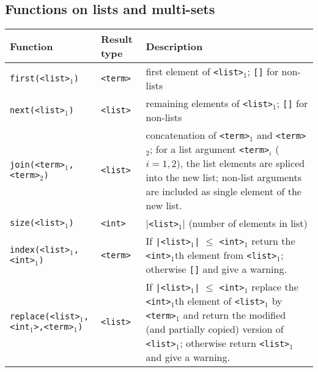 \documentclass[a4,twoside,noweb]{article} %
\begin{document}
\newpage

\subsection{Functions on lists and multi-sets}

\begin{tabular}{|l|l|p{8cm}|} \hline
 Function                       & Result type   & Description \\ \hline
 {\tt first(<list>$_1$)}                & {\tt  <term>}  & first element of {\tt <list>$_1$}; {\tt []} for non-lists\\
 {\tt next(<list>$_1$)}                 & {\tt  <list>}  & remaining elements of {\tt <list>$_1$}; {\tt []} for non-lists \\
 {\tt join(<term>$_1$,<term>$_2$)}      & {\tt  <list>}  & concatenation of {\tt <term>$_1$} and {\tt <term>$_2$};
                                                           for a list argument {\tt <term>$_i$} ($i=1,2$),
                                                           the list elements are spliced into the new list;
                                                           non-list arguments are included as single element of the
                                                           new list. \\
 {\tt size(<list>$_1$)}                 & {\tt  <int>}   & {\tt $|$<list>$_1|$} (number of elements in list)\\ \hline

 {\tt index(<list>$_1$,<int>$_1$)}      & {\tt <term>}   & If {\tt |<list>$_1$|} $\leq$ {\tt <int>$_1$} return the
                                                           {\tt <int>$_1$}th element from {\tt <list>$_1$};
                                                           otherwise {\tt []} and give a warning.\\
 {\tt replace(<list>$_1$,<int$_1$>,<term>$_1$)} & {\tt <list>}   &  If {\tt |<list>$_1$|} $\leq$ {\tt <int>$_1$} replace the
                                                           {\tt <int>$_1$}th element of {\tt <list>$_1$} by 
                                                           {\tt <term>$_1$} and return the modified (and partially
                                                           copied) version of {\tt <list>$_1$};
                                                           otherwise return {\tt <list>$_1$} and give a warning.\\  \hline


\end{tabular}
\end{document}
